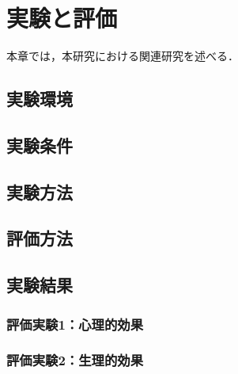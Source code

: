 ﻿\chapter{実験と評価}
本章では，本研究における関連研究を述べる．

\section{実験環境}

\section{実験条件}

\section{実験方法}

\section{評価方法}

\section{実験結果}

\subsection{評価実験1：心理的効果}

\subsection{評価実験2：生理的効果}